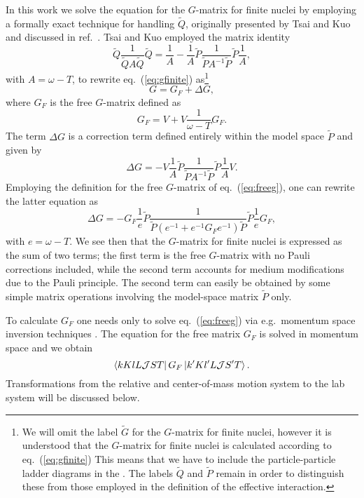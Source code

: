 In this work we solve the equation for the $G$-matrix
for finite nuclei by employing
a formally
exact technique for handling $\tilde{Q}$, originally presented by
Tsai and Kuo \cite{tk72} and discussed in ref.\ \cite{kkko76}.
Tsai and Kuo employed the matrix identity
\begin{equation}
  \tilde{Q}\frac{1}{\tilde{Q}A\tilde{Q}}
  \tilde{Q}=\frac{1}{A}-
   \frac{1}{A}\tilde{P}\frac{1}{\tilde{P}A^{-1}\tilde{P}}\tilde{P}\frac{1}{A},
\end{equation}
with $A=\omega -T$, to rewrite eq.\ (\ref{eq:gfinite}) as\footnote{We will omit the
label $\tilde{G}$ for the $G$-matrix for finite nuclei, however it is
understood that the $G$-matrix for finite nuclei is calculated according
to eq.\ (\ref{eq:gfinite}) This means that we have to 
include the particle-particle ladder diagrams in the 
\qbox. The labels $\tilde{Q}$ and $\tilde{P}$
remain in order to distinguish these from those employed in the
definition of the effective interaction.}
\begin{equation}
   G = G_{F} +\Delta G,\label{eq:gmod}
\end{equation}
where $G_{F}$ is the free $G$-matrix defined as
\begin{equation}
   G_{F}=V+V\frac{1}{\omega - T}G_{F}. \label{eq:freeg}
\end{equation}
The term $\Delta G$ is a correction term defined entirely within the
model space $\tilde{P}$ and given by
\begin{equation}
   \Delta G =-V\frac{1}{A}\tilde{P}
   \frac{1}{\tilde{P}A^{-1}\tilde{P}}\tilde{P}\frac{1}{A}V.
\end{equation}
Employing the definition for the free $G$-matrix of eq.\ (\ref{eq:freeg}),
one can rewrite the latter equation as
\begin{equation}
  \Delta G =-G_{F}\frac{1}{e}\tilde{P}
  \frac{1}{\tilde{P}(e^{-1}+e^{-1}G_{F}e^{-1})
  \tilde{P}}\tilde{P}\frac{1}{e}G_F,
\end{equation}
with $e=\omega -T$.
We see then that the $G$-matrix for finite nuclei
is expressed as the sum of two
terms; the first term is the free $G$-matrix with no Pauli corrections
included, while the second term accounts for medium modifications
due to the Pauli principle. The second term can easily
be obtained by some simple matrix operations involving
the model-space matrix $\tilde{P}$ only.

To calculate $G_F$ one needs only to solve eq.\ (\ref{eq:freeg})
via e.g.\ momentum space inversion techniques \cite{ht70}.
The equation for the free matrix $G_F$ is solved in momentum space and we
obtain
\begin{equation}
    \left\langle kKlL{\cal J}ST \right|G_F\left| k'Kl'L{\cal J}S'T \right\rangle.\label{eq:freeg2}
\end{equation}
Transformations from the relative and center-of-mass motion
system to the lab system will be discussed
below.

